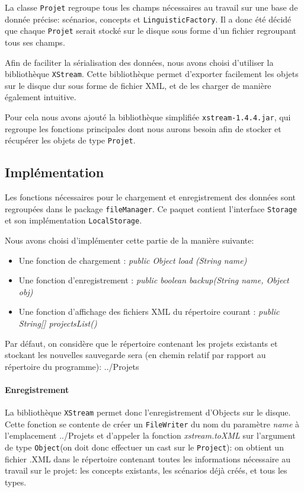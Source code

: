 \documentclass[12pt]{report}
\begin{document}
	La classe \texttt{Projet} regroupe tous les champs nécessaires au travail sur une base de donnée précise: scénarios, concepts et \texttt{LinguisticFactory}.
Il a donc été décidé que chaque \texttt{Projet} serait stocké sur le disque sous forme d'un fichier regroupant tous ses champs.

	Afin de faciliter la sérialisation des données, nous avons choisi d'utiliser la bibliothèque \texttt{XStream}.
Cette bibliothèque permet d'exporter facilement les objets sur le disque dur sous forme de fichier XML, et de les charger de manière également
intuitive.

	Pour cela nous avons ajouté la bibliothèque simplifiée \texttt{xstream-1.4.4.jar}, qui regroupe les fonctions principales dont nous
aurons besoin afin de stocker et récupérer les objets de type \texttt{Projet}.

\subsection{Implémentation}

	Les fonctions nécessaires pour le chargement et enregistrement des données sont regroupées dans le package \texttt{fileManager}.
Ce paquet contient l'interface \texttt{Storage} et son implémentation \texttt{LocalStorage}.

	Nous avons choisi d'implémenter cette partie de la manière suivante:
	\begin{itemize}
	\item Une fonction de chargement : \emph{public Object load (String name)}
	\item Une fonction d'enregistrement : \emph{public boolean backup(String name, Object obj)}
	\item Une fonction d'affichage des fichiers XML du répertoire courant : \emph{public String[] projectsList()}
	\end{itemize}


Par défaut, on considère que le répertoire contenant les projets existants et stockant les nouvelles sauvegarde sera (en chemin relatif par rapport
au répertoire du programme): ../Projets

	\paragraph{Enregistrement}

La bibliothèque \texttt{XStream} permet donc l'enregistrement d'Objects sur le disque. Cette fonction se contente de créer un \texttt{FileWriter} du nom du paramètre \emph{name}
à l'emplacement ../Projets et d'appeler la fonction \emph{xstream.toXML} sur l'argument de type \texttt{Object}(on doit donc effectuer un cast sur le \texttt{Project}): on obtient un fichier .XML dans le répertoire contenant
toutes les informations nécessaire au travail sur le projet: les concepts existants, les scénarios déjà créés, et tous les types.
\end{document}
